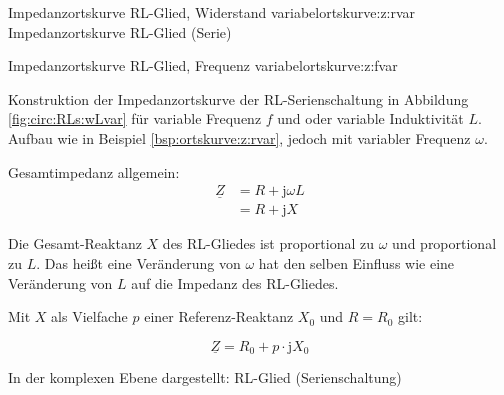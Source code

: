 {\begin{frame}
\begin{bsp}{
    Impedanzortskurve RL-Glied, Widerstand variabel}{ortskurve:z:rvar}
        {Impedanzortskurve RL-Glied (Serie)\label{fig:plot:rls:Rvar}}

\end{bsp}

\begin{bsp}{Impedanzortskurve RL-Glied, Frequenz variabel}{ortskurve:z:fvar}%

    Konstruktion der Impedanzortskurve der RL-Serienschaltung in Abbildung \ref{fig:circ:RLs:wLvar} 
    für variable Frequenz $f$ und oder variable Induktivität $L$.
    Aufbau wie in Beispiel \ref{bsp:ortskurve:z:rvar}, jedoch mit variabler Frequenz $\omega$.


    Gesamtimpedanz allgemein: 
    \begin{align*}
        \underline{Z}   &= R + \mathrm{j}\omega L \\
                        &= R + \mathrm{j}X
    \end{align*}

    Die Gesamt-Reaktanz $X$ des RL-Gliedes ist proportional zu $\omega$ und proportional zu $L$.
    Das heißt eine Veränderung von $\omega$ hat den selben Einfluss wie eine Veränderung von $L$ 
    auf die Impedanz des RL-Gliedes.
    
    Mit $X$ als Vielfache $p$ einer Referenz-Reaktanz $X_0$ und $R=R_0$ gilt:

    \begin{equation*}
        \underline{Z} = R_0 + p \cdot \mathrm{j}X_0 
    \end{equation*}

    In der komplexen Ebene dargestellt:
        {RL-Glied (Serienschaltung)}

\end{bsp}
\end{frame}
}%
